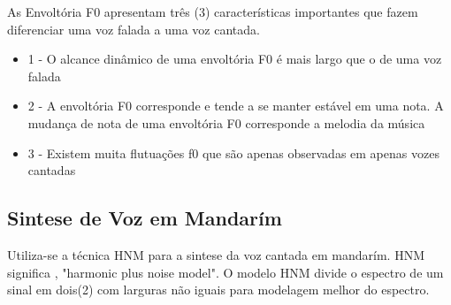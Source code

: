 	As Envoltória F0 apresentam três (3) características importantes que fazem diferenciar uma voz falada a uma voz cantada.\cite{SaitouNada}
	\linebreak
	\begin{itemize}
		\item 1 - O alcance dinâmico de uma envoltória F0 é mais largo que o de uma voz falada
		\item 2 - A envoltória F0 corresponde e tende a se manter estável em uma nota. A mudança de nota de uma envoltória F0 corresponde a melodia da música
		\item 3 - Existem muita flutuações f0 que são apenas observadas em apenas vozes cantadas
	\end{itemize}
	
	
	\subsection{Sintese de Voz em Mandarím}
		Utiliza-se a técnica HNM para a sintese da voz cantada em mandarím. HNM significa , "harmonic plus noise model".
		O modelo HNM divide o espectro de um sinal em dois(2) com larguras não iguais para modelagem melhor do espectro.\cite{LinRobos}
	